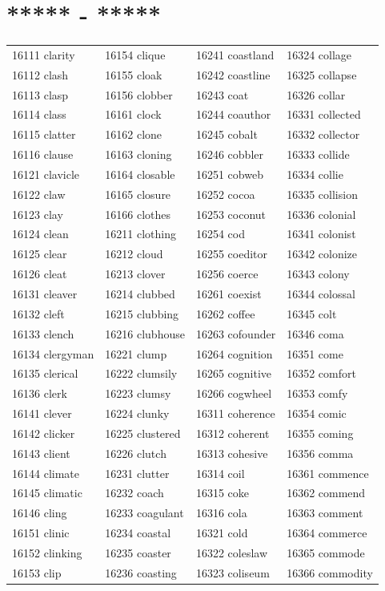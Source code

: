 \documentclass[10pt, oneside]{book}
\begin{document}
\begin{table}
	\centering
	\section*{***** - *****}
	\begin{tabular}{l l l l}
16111 clarity &16154 clique &16241 coastland &16324 collage\\
16112 clash &16155 cloak &16242 coastline &16325 collapse\\
16113 clasp &16156 clobber &16243 coat &16326 collar\\
16114 class &16161 clock &16244 coauthor &16331 collected\\
16115 clatter &16162 clone &16245 cobalt &16332 collector\\
16116 clause &16163 cloning &16246 cobbler &16333 collide\\
16121 clavicle &16164 closable &16251 cobweb &16334 collie\\
16122 claw &16165 closure &16252 cocoa &16335 collision\\
16123 clay &16166 clothes &16253 coconut &16336 colonial\\
16124 clean &16211 clothing &16254 cod &16341 colonist\\
16125 clear &16212 cloud &16255 coeditor &16342 colonize\\
16126 cleat &16213 clover &16256 coerce &16343 colony\\
16131 cleaver &16214 clubbed &16261 coexist &16344 colossal\\
16132 cleft &16215 clubbing &16262 coffee &16345 colt\\
16133 clench &16216 clubhouse &16263 cofounder &16346 coma\\
16134 clergyman &16221 clump &16264 cognition &16351 come\\
16135 clerical &16222 clumsily &16265 cognitive &16352 comfort\\
16136 clerk &16223 clumsy &16266 cogwheel &16353 comfy\\
16141 clever &16224 clunky &16311 coherence &16354 comic\\
16142 clicker &16225 clustered &16312 coherent &16355 coming\\
16143 client &16226 clutch &16313 cohesive &16356 comma\\
16144 climate &16231 clutter &16314 coil &16361 commence\\
16145 climatic &16232 coach &16315 coke &16362 commend\\
16146 cling &16233 coagulant &16316 cola &16363 comment\\
16151 clinic &16234 coastal &16321 cold &16364 commerce\\
16152 clinking &16235 coaster &16322 coleslaw &16365 commode\\
16153 clip &16236 coasting &16323 coliseum &16366 commodity\\
	\end{tabular}
 \end{table}
\end{document}
